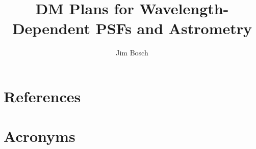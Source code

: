 \documentclass[DM,authoryear,toc]{lsstdoc}
\title{DM Plans for Wavelength-Dependent PSFs and Astrometry}
\author{%
Jim Bosch
}
\date{\vcsDate}
\begin{document}
\maketitle


\appendix
\section{References} \label{sec:bib}
\renewcommand{\refname}{} %


\section{Acronyms} \label{sec:acronyms}

\end{document}
